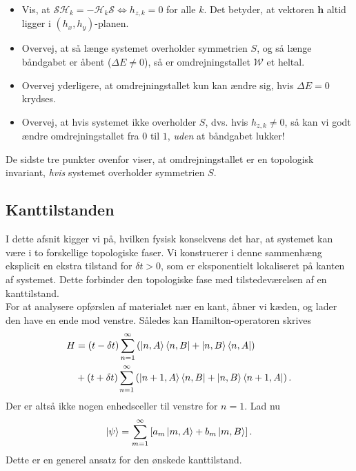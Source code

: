 \documentclass[11pt, a4paper]{article}
\begin{document}
\begin{itemize}
	\item Vis, at $\mathcal{S}\mathcal{H}_k = -\mathcal{H}_k\mathcal{S} \Leftrightarrow h_{z,k} = 0$ for alle $k$. Det betyder, at vektoren $\mathbf{h}$ altid ligger i $(h_x, h_y)$-planen. 

	\item Overvej, at så længe systemet overholder symmetrien $S$, og så længe båndgabet er åbent ($\Delta E \neq 0$), så er omdrejningstallet $\mathcal{W}$ et heltal. 

	\item Overvej yderligere, at omdrejningstallet kun kan ændre sig, hvis $\Delta E = 0$ krydses.

	\item Overvej, at hvis systemet ikke overholder $S$, dvs. hvis $h_{z, k} \neq 0$, så kan vi godt ændre omdrejningstallet fra $0$ til $1$, \textit{uden} at båndgabet lukker!
\end{itemize}

De sidste tre punkter ovenfor viser, at omdrejningstallet er en topologisk invariant, \textit{hvis} systemet overholder symmetrien $S$. 

\subsection{Kanttilstanden}
I dette afsnit kigger vi på, hvilken fysisk konsekvens det har, at systemet kan være i to forskellige topologiske faser. Vi konstruerer i denne sammenhæng eksplicit en ekstra tilstand for $\delta t > 0$, som er eksponentielt lokaliseret på kanten af systemet. Dette forbinder den topologiske fase med tilstedeværelsen af en kanttilstand. \\

For at analysere opførslen af materialet nær en kant, åbner vi kæden, og lader den have en ende mod venstre. Således kan Hamilton-operatoren skrives
\begin{align}
H &= (t - \delta t) \sum_{n = 1}^\infty\left(\ket{n, A}\bra{n, B} + \ket{n, B}\bra{n, A}\right) \nonumber \\
&+ (t + \delta t) \sum_{n = 1}^\infty\left(\ket{n + 1, A}\bra{n, B} + \ket{n, B}\bra{n + 1, A}\right).
\label{eq.hamilton_aaben}
\end{align}
Der er altså ikke nogen enhedsceller til venstre for $n = 1$. Lad nu
\begin{equation}
\ket{\psi} = \sum_{m = 1}^{\infty}\left[a_m \ket{m, A} + b_m \ket{m, B} \right]. 
\label{eq.kanttilstand_ansatz}
\end{equation}
Dette er en generel ansatz for den ønskede kanttilstand.
\end{document}
